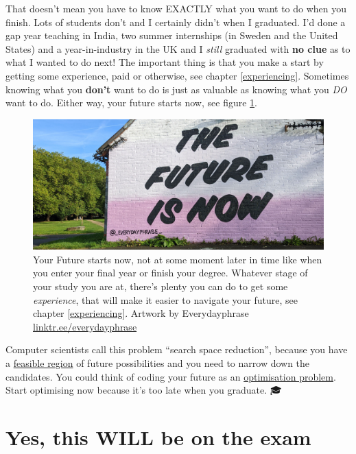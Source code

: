 \documentclass[
]{book}
\begin{document}
That doesn't mean you have to know EXACTLY what you want to do when you finish. Lots of students don't and I certainly didn't when I graduated. I'd done a gap year teaching in India, two summer internships (in Sweden and the United States) and a year-in-industry in the UK and I \emph{still} graduated with \textbf{no clue} as to what I wanted to do next! The important thing is that you make a start by getting some experience, paid or otherwise, see chapter \ref{experiencing}. Sometimes knowing what you \textbf{don't} want to do is just as valuable as knowing what you \emph{DO} want to do. Either way, your future starts now, see figure \ref{fig:future-now-fig}.

\begin{figure}

{\centering \includegraphics[width=0.99\linewidth]{images/the-future-is-now} 

}

\caption{Your Future starts now, not at some moment later in time like when you enter your final year or finish your degree. Whatever stage of your study you are at, there's plenty you can do to get some \emph{experience}, that will make it easier to navigate your future, see chapter \ref{experiencing}. Artwork by Everydayphrase \href{https://linktr.ee/everydayphrase}{linktr.ee/everydayphrase}}\label{fig:future-now-fig}
\end{figure}



Computer scientists call this problem ``search space reduction'', \citep{searchspace} because you have a \href{https://en.wikipedia.org/wiki/Feasible_region}{feasible region} of future possibilities and you need to narrow down the candidates. You could think of coding your future as an \href{https://en.wikipedia.org/wiki/Optimization_problem}{optimisation problem}. Start optimising now because it's too late when you graduate. 🎓

\hypertarget{exams}{%
\section{Yes, this WILL be on the exam}\label{exams}}
\end{document}
